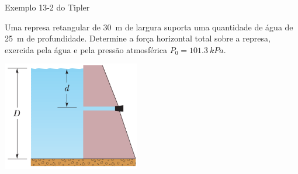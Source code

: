 \begin{frame}{Exemplo 13-2 do Tipler}
    \begin{minipage}{\textwidth}
        Uma represa retangular de \SI{30}{m} de largura suporta uma quantidade
        de água de \SI{25}{m} de profundidade. Determine a força horizontal
        total sobre a represa, exercida pela água e pela pressão atmosférica
        $P_0 = \SI{101.3}{kPa}$.
    \end{minipage}
    \begin{center}
        \includegraphics[width=0.45\textwidth]{images/represa}
    \end{center}
\end{frame}

